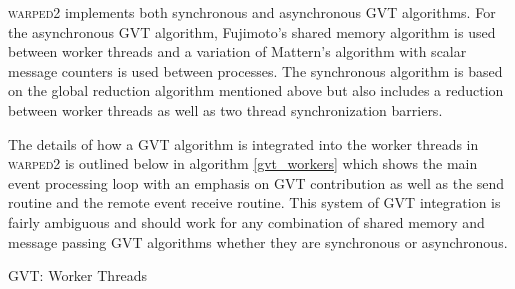 \documentclass[11pt]{book}
\begin{document}
\textsc{warped2} implements both synchronous and asynchronous GVT algorithms.  For the
asynchronous GVT algorithm, Fujimoto's shared memory algorithm is used between worker threads
and a variation of Mattern's algorithm with scalar message counters is used between processes.
The synchronous algorithm is based on the global reduction algorithm mentioned above but also
includes a reduction between worker threads as well as two thread synchronization barriers.

The details of how a GVT algorithm is integrated into the worker threads in \textsc{warped2}
is outlined below in algorithm \ref{gvt_workers} which shows the main event processing loop
with an emphasis on GVT contribution as well as the send routine and the remote event receive
routine.  This system of GVT integration is fairly ambiguous and should work for any combination of
shared memory and message passing GVT algorithms whether they are synchronous or asynchronous.

\begin{algorithm}
\DontPrintSemicolon
{}

    \;

    \;


    \caption{GVT: Worker Threads}\label{gvt_workers}
\end{algorithm}
\end{document}
